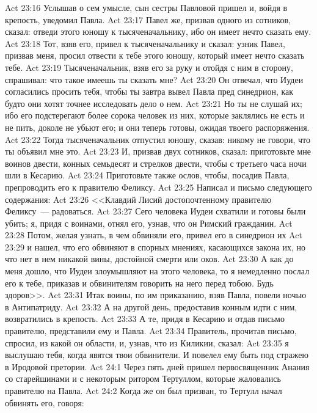 \vs Act 23:16 Услышав о сем умысле, сын сестры Павловой пришел и, войдя в крепость, уведомил Павла.
\vs Act 23:17 Павел же, призвав одного из сотников, сказал: отведи этого юношу к тысяченачальнику, ибо он имеет нечто сказать ему.
\vs Act 23:18 Тот, взяв его, привел к тысяченачальнику и сказал: узник Павел, призвав меня, просил отвести к тебе этого юношу, который имеет нечто сказать тебе.
\vs Act 23:19 Тысяченачальник, взяв его за руку и отойдя с ним в сторону, спрашивал: что такое имеешь ты сказать мне?
\vs Act 23:20 Он отвечал, что Иудеи согласились просить тебя, чтобы ты завтра вывел Павла пред синедрион, как будто они хотят точнее исследовать дело о нем.
\vs Act 23:21 Но ты не слушай их; ибо его подстерегают более сорока человек из них, которые заклялись не есть и не пить, доколе не убьют его; и они теперь готовы, ожидая твоего распоряжения.
\vs Act 23:22 Тогда тысяченачальник отпустил юношу, сказав: никому не говори, что ты объявил мне это.
\rsbpar\vs Act 23:23 И, призвав двух сотников, сказал: приготовьте мне воинов  двести, конных семьдесят и стрелков двести, чтобы с третьего часа ночи шли в Кесарию.
\vs Act 23:24 Приготовьте также ослов, чтобы, посадив Павла, препроводить его к правителю Феликсу.
\vs Act 23:25 Написал и письмо следующего содержания:
\vs Act 23:26 <<Клавдий Лисий достопочтенному правителю Феликсу~--- радоваться.
\vs Act 23:27 Сего человека Иудеи схватили и готовы были убить; я, придя с воинами, отнял его, узнав, что он Римский гражданин.
\vs Act 23:28 Потом, желая узнать, в чем обвиняли его, привел его в синедрион их
\vs Act 23:29 и нашел, что его обвиняют в спорных мнениях, касающихся закона их, но что нет в нем никакой вины, достойной смерти или оков.
\vs Act 23:30 А как до меня дошло, что Иудеи злоумышляют на этого человека, то я немедленно послал его к тебе, приказав и обвинителям говорить на него перед тобою. Будь здоров>>.
\rsbpar\vs Act 23:31 Итак воины, по  им приказанию, взяв Павла, повели ночью в Антипатриду.
\vs Act 23:32 А на другой день, предоставив конным идти с ним, возвратились в крепость.
\vs Act 23:33 А те, придя в Кесарию и отдав письмо правителю, представили ему и Павла.
\vs Act 23:34 Правитель, прочитав письмо, спросил, из какой он области, и, узнав, что из Киликии, сказал:
\vs Act 23:35 я выслушаю тебя, когда явятся твои обвинители. И повелел ему быть под стражею в Иродовой претории.
\vs Act 24:1 Через пять дней пришел первосвященник Анания со старейшинами и с некоторым ритором Тертуллом, которые жаловались правителю на Павла.
\vs Act 24:2 Когда же он был призван, то Тертулл начал обвинять его, говоря:
